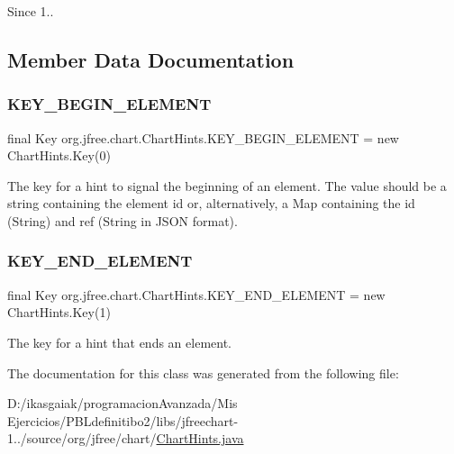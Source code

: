 \begin{DoxySince}{Since}
1.. 
\end{DoxySince}


\subsection{Member Data Documentation}
\mbox{\label{classorg_1_1jfree_1_1chart_1_1_chart_hints_a9a277800f7e1bb7451f2501f22dfcac7}} 
\subsubsection{\texorpdfstring{K\+E\+Y\+\_\+\+B\+E\+G\+I\+N\+\_\+\+E\+L\+E\+M\+E\+NT}{KEY\_BEGIN\_ELEMENT}}
{\footnotesize\ttfamily final Key org.\+jfree.\+chart.\+Chart\+Hints.\+K\+E\+Y\+\_\+\+B\+E\+G\+I\+N\+\_\+\+E\+L\+E\+M\+E\+NT = new Chart\+Hints.\+Key(0)\hspace{0.3cm}{\ttfamily [static]}}

The key for a hint to signal the beginning of an element. The value should be a string containing the element id or, alternatively, a Map containing the \textquotesingle{}id\textquotesingle{} (String) and \textquotesingle{}ref\textquotesingle{} (String in J\+S\+ON format). \mbox{\label{classorg_1_1jfree_1_1chart_1_1_chart_hints_aa000d8596f376cf98e1ca44d595322e4}} 
\subsubsection{\texorpdfstring{K\+E\+Y\+\_\+\+E\+N\+D\+\_\+\+E\+L\+E\+M\+E\+NT}{KEY\_END\_ELEMENT}}
{\footnotesize\ttfamily final Key org.\+jfree.\+chart.\+Chart\+Hints.\+K\+E\+Y\+\_\+\+E\+N\+D\+\_\+\+E\+L\+E\+M\+E\+NT = new Chart\+Hints.\+Key(1)\hspace{0.3cm}{\ttfamily [static]}}

The key for a hint that ends an element. 

The documentation for this class was generated from the following file\+:\begin{DoxyCompactItemize}
\item 
D\+:/ikasgaiak/programacion\+Avanzada/\+Mis Ejercicios/\+P\+B\+Ldefinitibo2/libs/jfreechart-\/1../source/org/jfree/chart/\mbox{\hyperlink{_chart_hints_8java}{Chart\+Hints.\+java}}\end{DoxyCompactItemize}
